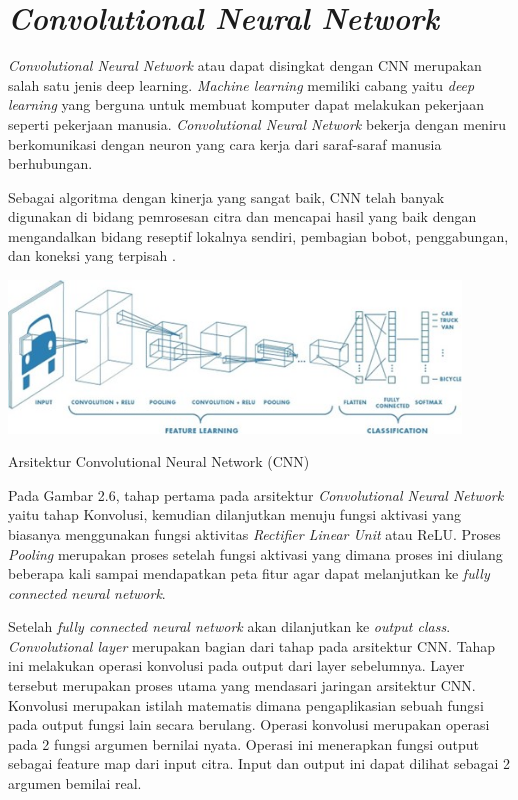 \section{\textit{Convolutional Neural Network}}
\textit{Convolutional Neural Network} atau dapat disingkat dengan CNN merupakan salah satu jenis deep learning. \textit{Machine learning} memiliki cabang yaitu \textit{deep learning} yang berguna untuk membuat komputer dapat melakukan pekerjaan seperti pekerjaan manusia. \textit{Convolutional Neural Network} bekerja dengan meniru berkomunikasi dengan neuron yang cara kerja dari saraf-saraf manusia berhubungan.

Sebagai algoritma dengan kinerja yang sangat baik, CNN telah banyak digunakan di bidang pemrosesan citra dan mencapai hasil yang baik dengan mengandalkan bidang reseptif lokalnya sendiri, pembagian bobot, penggabungan, dan koneksi yang terpisah \cite{tian2020}.

\begin{afigure}
    \includegraphics[width=0.9\textwidth, center]{images/Picture6.jpg}
    \caption{Arsitektur Convolutional Neural Network (CNN)}
    \label{fig:cnn} 
\end{afigure}

Pada Gambar 2.6, tahap pertama pada arsitektur\textit{ Convolutional Neural Network} yaitu tahap Konvolusi, kemudian dilanjutkan menuju fungsi aktivasi yang biasanya menggunakan fungsi aktivitas \textit{Rectifier Linear Unit} atau ReLU. Proses \textit{Pooling} merupakan proses setelah fungsi aktivasi yang dimana proses ini diulang beberapa kali sampai mendapatkan peta fitur agar dapat melanjutkan ke \textit{fully connected neural network}.

Setelah \textit{fully connected neural network} akan dilanjutkan ke \textit{output class}. \textit{Convolutional layer} merupakan bagian dari tahap pada arsitektur CNN. Tahap ini melakukan operasi konvolusi pada output dari layer sebelumnya. Layer tersebut merupakan proses utama yang mendasari jaringan arsitektur CNN. Konvolusi merupakan istilah matematis dimana pengaplikasian sebuah fungsi pada output fungsi lain secara berulang. Operasi konvolusi merupakan operasi pada 2 fungsi argumen bernilai nyata. Operasi ini menerapkan fungsi output sebagai feature map dari input citra. Input dan output ini dapat dilihat sebagai 2 argumen bemilai real.

